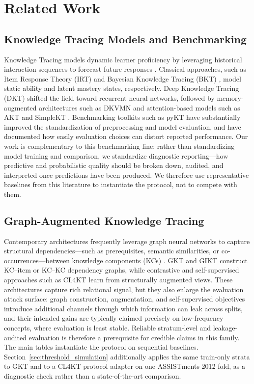 \section{Related Work}
\label{sec:related}

\subsection{Knowledge Tracing Models and Benchmarking}
Knowledge Tracing models dynamic learner proficiency by leveraging historical interaction sequences to forecast future responses \citep{abdelrahman2023knowledge}. Classical approaches, such as Item Response Theory (IRT) \citep{rasch1960probabilistic,embretson2000item} and Bayesian Knowledge Tracing (BKT) \citep{corbett1994knowledge}, model static ability and latent mastery states, respectively. Deep Knowledge Tracing (DKT) \citep{piech2015deep} shifted the field toward recurrent neural networks, followed by memory-augmented architectures such as DKVMN \citep{zhang2017dynamic} and attention-based models such as AKT \citep{ghosh2020context} and SimpleKT \citep{liu2023simplekt}. Benchmarking toolkits such as pyKT \citep{liu2022pykt} have substantially improved the standardization of preprocessing and model evaluation, and have documented how easily evaluation choices can distort reported performance. Our work is complementary to this benchmarking line: rather than standardizing model training and comparison, we standardize diagnostic reporting---how predictive and probabilistic quality should be broken down, audited, and interpreted once predictions have been produced. We therefore use representative baselines from this literature to instantiate the protocol, not to compete with them.

\subsection{Graph-Augmented Knowledge Tracing}
Contemporary architectures frequently leverage graph neural networks to capture structural dependencies---such as prerequisites, semantic similarities, or co-occurrences---between knowledge components (KCs) \citep{abdelrahman2023knowledge}. GKT \citep{nakagawa2019graph} and GIKT \citep{yang2021gikt} construct KC--item or KC--KC dependency graphs, while contrastive and self-supervised approaches such as CL4KT \citep{lee2022cl4kt} learn from structurally augmented views. These architectures capture rich relational signal, but they also enlarge the evaluation attack surface: graph construction, augmentation, and self-supervised objectives introduce additional channels through which information can leak across splits, and their intended gains are typically claimed precisely on low-frequency concepts, where evaluation is least stable. Reliable stratum-level and leakage-audited evaluation is therefore a prerequisite for credible claims in this family. The main tables instantiate the protocol on sequential baselines. Section~\ref{sec:threshold_simulation} additionally applies the same train-only strata to GKT and to a CL4KT protocol adapter on one ASSISTments 2012 fold, as a diagnostic check rather than a state-of-the-art comparison.


